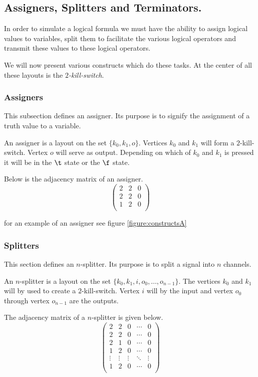 \subsection{Assigners, Splitters and Terminators.}

In order to simulate a logical formula we must have the ability to
assign logical values to variables, split them to facilitate the various
logical operators and transmit these values to these logical operators.

We will now present various constructs which do these tasks. At the
center of all these layouts is the \emph{$2$-kill-switch}.

\subsubsection{Assigners}

This subsection defines an assigner. Its purpose is to signify the
assignment of a truth value to a variable.

An assigner is a layout on the set $\{k_{0},k_{1},o\}$. Vertices $k_{0}$
and $k_{1}$ will form a $2$-kill-switch. Vertex $o$ will serve as
output. Depending on which of $k_{0}$ and $k_{1}$ is pressed it will
be in the $\t$ state or the $\f$ state.

Below is the adjacency matrix of an assigner.
\[
	\left(
	\begin{array}{ccc}
		2 & 2 & 0 \\
		2 & 2 & 0 \\
		1 & 2 & 0 \\
	\end{array}
	\right)
\]

for an example of an assigner see figure \ref{figure:constructsA}

\subsubsection{Splitters}

This section defines an $n$-splitter. Its purpose is to split a signal
into $n$ channels.

An $n$-splitter is a layout on the set
$\{k_{0},k_{1},i,o_{0},\ldots,o_{n-1}\}$. The vertices
$k_{0}$ and $k_{1}$ will by used to create a $2$-kill-switch. Vertex $i$
will by the input and vertex $o_{0}$ through vertex $o_{n-1}$ are the
outputs.	

The adjacency matrix of a $n$-splitter is given below.
\[
	\left(
	\begin{array}{ccccc}
		2 & 2 & 0 & \cdots & 0 \\
		2 & 2 & 0 & \cdots & 0 \\
		2 & 1 & 0 & \cdots & 0 \\
		1 & 2 & 0 & \cdots & 0 \\
		\vdots & \vdots & \vdots & \ddots & \vdots \\
		1 & 2 & 0 & \cdots & 0 \\
	\end{array}
	\right)
\]

